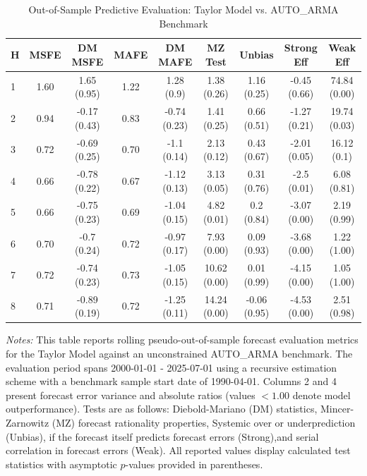 \begin{table}[htbp]
\centering
\caption{Out-of-Sample Predictive Evaluation: Taylor Model vs. AUTO_ARMA Benchmark}
\label{tab:taylor_model_evaluation}
\footnotesize
\begin{tabular}{l cccccccc}
\hline\hline
\rule{0pt}{3ex}
\textbf{H} & \textbf{MSFE} & \textbf{DM MSFE} & \textbf{MAFE} & \textbf{DM MAFE} & \textbf{MZ Test} & \textbf{Unbias} & \textbf{Strong Eff} & \textbf{Weak Eff} \\[0.5ex]
\hline
\rule{0pt}{2.5ex}
1 & 1.60 & 1.65 (0.95) & 1.22 & 1.28 (0.9) & 1.38 (0.26) & 1.16 (0.25) & -0.45 (0.66) & 74.84 (0.00) \\
2 & 0.94 & -0.17 (0.43) & 0.83 & -0.74 (0.23) & 1.41 (0.25) & 0.66 (0.51) & -1.27 (0.21) & 19.74 (0.03) \\
3 & 0.72 & -0.69 (0.25) & 0.70 & -1.1 (0.14) & 2.13 (0.12) & 0.43 (0.67) & -2.01 (0.05) & 16.12 (0.1) \\
4 & 0.66 & -0.78 (0.22) & 0.67 & -1.12 (0.13) & 3.13 (0.05) & 0.31 (0.76) & -2.5 (0.01) & 6.08 (0.81) \\
5 & 0.66 & -0.75 (0.23) & 0.69 & -1.04 (0.15) & 4.82 (0.01) & 0.2 (0.84) & -3.07 (0.00) & 2.19 (0.99) \\
6 & 0.70 & -0.7 (0.24) & 0.72 & -0.97 (0.17) & 7.93 (0.00) & 0.09 (0.93) & -3.68 (0.00) & 1.22 (1.00) \\
7 & 0.72 & -0.74 (0.23) & 0.73 & -1.05 (0.15) & 10.62 (0.00) & 0.01 (0.99) & -4.15 (0.00) & 1.05 (1.00) \\
8 & 0.71 & -0.89 (0.19) & 0.72 & -1.25 (0.11) & 14.24 (0.00) & -0.06 (0.95) & -4.53 (0.00) & 2.51 (0.98) \\
\hline\hline
\end{tabular}%
\par\smallskip
\parbox{\textwidth}{\scriptsize \textit{Notes:} This table reports rolling pseudo-out-of-sample forecast evaluation metrics for the Taylor Model against an unconstrained AUTO_ARMA benchmark. The evaluation period spans 2000-01-01 - 2025-07-01 using a recursive estimation scheme with a benchmark sample start date of 1990-04-01. Columns 2 and 4 present forecast error variance and absolute ratios (values $< 1.00$ denote model outperformance). Tests are as follows: Diebold-Mariano (DM) statistics, Mincer-Zarnowitz (MZ) forecast rationality properties, Systemic over or underprediction (Unbias), if the forecast itself predicts forecast errors (Strong),and serial correlation in forecast errors (Weak). All reported values display calculated test statistics with asymptotic $p$-values provided in parentheses.}
\end{table}

